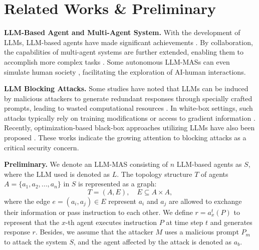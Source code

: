 \section{Related Works \& Preliminary}
\label{sec:re}

\noindent\textbf{LLM-Based Agent and Multi-Agent System.} \label{sec: rw1}
With the development of LLMs, LLM-based agents have made significant achievements \cite{yaoreact,shen2023hugginggpt}. 
By collaboration, the capabilities of multi-agent systems are further extended, enabling them to accomplish more complex tasks \cite{ct2, ct1}. 
Some autonomous LLM-MASs can even simulate human society \cite{sim2, sim1}, facilitating the exploration of AI-human interactions. 

\noindent\textbf{LLM Blocking Attacks.} \label{sec: rw2}
Some studies have noted that LLMs can be induced by malicious attackers to generate redundant responses through specially crafted prompts, leading to wasted computational resources \cite{gcgdos}. 
In white-box settings, such attacks typically rely on training modifications or access to gradient information \cite{pdos, edos}. 
Recently, optimization-based black-box approaches utilizing LLMs have also been proposed \cite{autodos}. 
These works indicate the growing attention to blocking attacks as a critical security concern.

\noindent \textbf{Preliminary.} We denote an LLM-MAS consisting of \( n \) LLM-based agents as $S$, where the LLM used is denoted as \( L \). 
The topology structure $T$ of agents $A = \{a_1, a_2, ..., a_n\}$ in $S$ is represented as a graph:
\[
T = (A, E), \quad E \subseteq A \times A,
\]
where the edge $e=(a_i, a_j) \in E$ represent $a_i$ and $a_j$ are allowed to exchange their information or pass instruction to each other. We define \( r = a_x^t(P) \) to represent that the \( x \)-th agent executes instruction \( P \) at time step \( t \) and generates response \( r \).
Besides, we assume that the attacker $M$ uses a malicious prompt $P_m$ to attack the system $S$, and the agent affected by the attack is denoted as $a_b$.